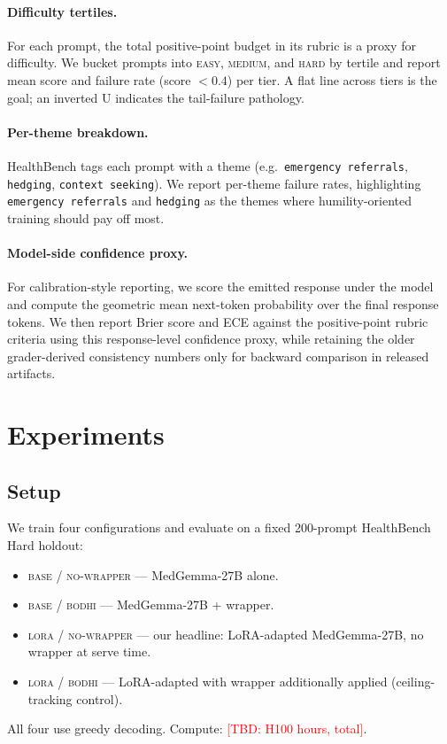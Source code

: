 \documentclass[10pt,letterpaper]{article}
\newcommand{\tbd}[1]{\textcolor{red}{[TBD: #1]}}
\begin{document}
\paragraph{Difficulty tertiles.} For each prompt, the total
positive-point budget in its rubric is a proxy for difficulty.
We bucket prompts into \textsc{easy}, \textsc{medium}, and \textsc{hard}
by tertile and report mean score and failure rate (score $< 0.4$) per
tier. A flat line across tiers is the goal; an inverted U
indicates the tail-failure pathology.

\paragraph{Per-theme breakdown.}
HealthBench tags each prompt with a theme (e.g.\ \texttt{emergency
referrals}, \texttt{hedging}, \texttt{context seeking}). We report
per-theme failure rates, highlighting \texttt{emergency referrals} and
\texttt{hedging} as the themes where humility-oriented training should
pay off most.

\paragraph{Model-side confidence proxy.}
For calibration-style reporting, we score the emitted response under the
model and compute the geometric mean next-token probability over the
final response tokens. We then report Brier score and ECE against the
positive-point rubric criteria using this response-level confidence
proxy, while retaining the older grader-derived consistency numbers only
for backward comparison in released artifacts.

\section{Experiments}
\label{sec:experiments}

\subsection{Setup}
We train four configurations and evaluate on a fixed 200-prompt
HealthBench Hard holdout:
\begin{itemize}[leftmargin=*,topsep=0pt,itemsep=1pt]
\item \textsc{base / no-wrapper} --- MedGemma-27B alone.
\item \textsc{base / bodhi} --- MedGemma-27B + wrapper.
\item \textsc{lora / no-wrapper} --- our headline: LoRA-adapted
      MedGemma-27B, no wrapper at serve time.
\item \textsc{lora / bodhi} --- LoRA-adapted with wrapper
      additionally applied (ceiling-tracking control).
\end{itemize}
All four use greedy decoding. Compute: \tbd{H100 hours, total}.
\end{document}
